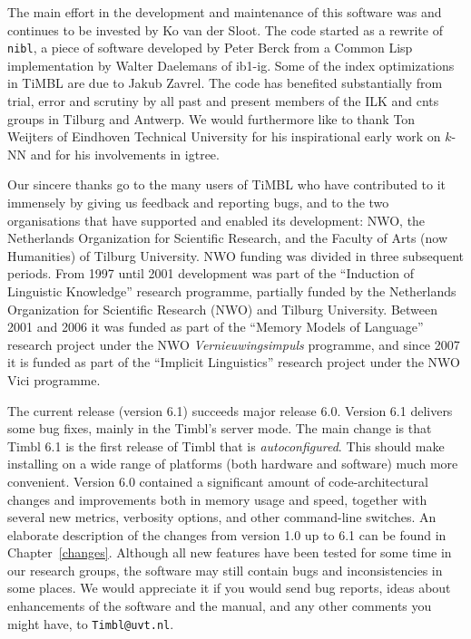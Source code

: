 \documentclass{report}
\begin{document}
The main effort in the development and maintenance of this software
was and continues to be invested by Ko van der Sloot. The code started
as a rewrite of {\tt nibl}, a piece of software developed by Peter
Berck from a Common Lisp implementation by Walter Daelemans of {\sc
  ib1-ig}. Some of the index optimizations in TiMBL are due to Jakub
Zavrel. The code has benefited substantially from trial, error and
scrutiny by all past and present members of the ILK and {\sc cnts}
groups in Tilburg and Antwerp. We would furthermore like to thank Ton
Weijters of Eindhoven Technical University for his inspirational early
work on $k$-NN and for his involvements in {\sc igtree}.

Our sincere thanks go to the many users of TiMBL who have contributed
to it immensely by giving us feedback and reporting bugs, and to the
two organisations that have supported and enabled its development:
NWO, the Netherlands Organization for Scientific Research, and the
Faculty of Arts (now Humanities) of Tilburg University. NWO funding
was divided in three subsequent periods. From 1997 until 2001
development was part of the ``Induction of Linguistic Knowledge''
research programme, partially funded by the Netherlands Organization
for Scientific Research (NWO) and Tilburg University. Between 2001 and
2006 it was funded as part of the ``Memory Models of Language''
research project under the NWO {\em Vernieuwingsimpuls}\/ programme,
and since 2007 it is funded as part of the ``Implicit Linguistics''
research project under the NWO Vici programme.

The current release (version 6.1) succeeds major release 6.0.  Version
6.1 delivers some bug fixes, mainly in the Timbl's server mode. The
main change is that Timbl 6.1 is the first release of Timbl that is
{\em autoconfigured}. This should make installing on a wide range of
platforms (both hardware and software) much more convenient.  Version
6.0 contained a significant amount of code-architectural changes and
improvements both in memory usage and speed, together with several new
metrics, verbosity options, and other command-line switches. An
elaborate description of the changes from version 1.0 up to 6.1 can be
found in Chapter~\ref{changes}. Although all new features have been
tested for some time in our research groups, the software may still
contain bugs and inconsistencies in some places. We would appreciate
it if you would send bug reports, ideas about enhancements of the
software and the manual, and any other comments you might have, to
{\tt Timbl@uvt.nl}.
\end{document}

